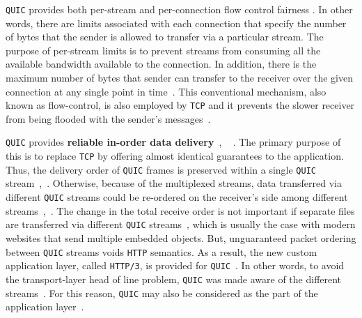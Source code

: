 \documentclass[12pt,a4paper]{report}
\begin{document}
  
  
  \texttt{QUIC} provides both per-stream and per-connection flow control fairness \cite{ietf-quic-transport-draft-32}.
  In other words, there are limits associated with each connection that specify the number of bytes that the sender is allowed to transfer via a particular stream.
  The purpose of per-stream limits is to prevent streams from consuming all the available bandwidth available to the connection.
  In addition, there is the maximum number of bytes that sender can transfer to the receiver over the given connection at any single point in time~\cite{ietf-quic-transport-draft-32}.
  This conventional mechanism, also known as flow-control, is also employed by \texttt{TCP} and it prevents the slower receiver from being flooded with the sender's messages~\cite{ietf-quic-transport-draft-32}.
  
  
    \texttt{QUIC} provides \textbf{reliable in-order data delivery}~\cite[Section 7]{ietf-quic-transport-draft-32}, ~\cite{head-of-line-blocking-in-quic-and-http-3-the-details} .
    The primary purpose of this is to replace \texttt{TCP} by offering almost identical guarantees to the application. 
    Thus, the delivery order of \texttt{QUIC} frames is preserved within a single \texttt{QUIC} stream~\cite{head-of-line-blocking-in-quic-and-http-3-the-details},~\cite[Section 2]{ietf-quic-transport-draft-32}.
    Otherwise, because of the multiplexed streams, data transferred via different \texttt{QUIC} streams could be re-ordered on the receiver's side among different streams~\cite{head-of-line-blocking-in-quic-and-http-3-the-details},~\cite[Section 2]{ietf-quic-transport-draft-32}.
    The change in the total receive order is not important if separate files are transferred via different \texttt{QUIC} streams~\cite{head-of-line-blocking-in-quic-and-http-3-the-details}, which is usually the case with modern websites that send multiple embedded objects.
    But, unguaranteed packet ordering between \texttt{QUIC} streams voids \texttt{HTTP} semantics.
    As a result, the new custom application layer, called \texttt{HTTP/3}, is provided for \texttt{QUIC}~\cite{head-of-line-blocking-in-quic-and-http-3-the-details}.
    In other words, to avoid the transport-layer head of line problem, \texttt{QUIC} was made aware of the different streams~\cite{head-of-line-blocking-in-quic-and-http-3-the-details}.
    For this reason, \texttt{QUIC} may also be considered as the part of the application layer~\cite{head-of-line-blocking-in-quic-and-http-3-the-details}.
    
\end{document}
